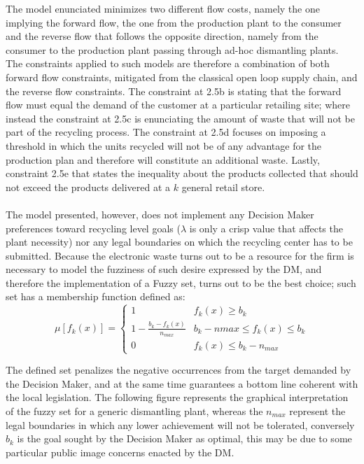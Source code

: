\begin{doublespace}
The model enunciated minimizes two different flow costs, namely the one implying the forward flow, the one from the production plant to the consumer and the reverse flow that follows the opposite direction, namely from the consumer to the production plant passing through ad-hoc dismantling plants. The constraints applied to such models are therefore a combination of both forward flow constraints, mitigated from the classical open loop supply chain, and the reverse flow constraints. The constraint at 2.5b is stating that the forward flow must equal the demand of the customer at a particular retailing site; where instead the constraint at 2.5c is enunciating the amount of waste that will not be part of the recycling process. The constraint at 2.5d focuses on imposing a threshold in which the units recycled will not be of any advantage for the production plan and therefore will constitute an additional waste. Lastly, constraint 2.5e that states the inequality about the products collected that should not exceed the products delivered at a $k$ general retail store. 
\\
\\
The model presented, however, does not implement any Decision Maker preferences toward recycling level goals ($\lambda$ is only a crisp value that affects the plant necessity) nor any legal boundaries on which the recycling center has to be submitted. Because the electronic waste turns out to be a resource for the firm is necessary to model the fuzziness of such desire expressed by the DM, and therefore the implementation of a Fuzzy set\cite{Zadeh1965}, turns out to be the best choice; such set has a membership function defined as:
$$
\mu [f_k(x)]=
\begin{cases}
1 & f_k(x) \geq b_k \\
1-\frac{b_k-f_k(x)}{n_{max}} & b_k -n{max} \leq f_k(x) \leq b_k \\
0 & f_k(x) \leq b_k - n_{max}
\end{cases}
$$

The defined set penalizes the negative occurrences from the target demanded by the Decision Maker, and at the same time guarantees a bottom line coherent with the local legislation. The following figure represents the graphical interpretation of the fuzzy set for a generic dismantling plant, whereas the $n_{max}$ represent the legal boundaries in which any lower achievement will not be tolerated, conversely $b_k$ is the goal sought by the Decision Maker as optimal, this may be due to some particular public image concerns enacted by the DM. 


\end{doublespace}
